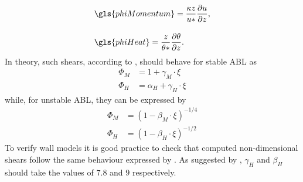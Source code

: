 \begin{align}
	& \gls{phiMomentum} = \frac{\kappa z}{u*} \frac{\partial u}{\partial z}, \\[10pt]
	& \gls{phiHeat} = \frac{z}{\theta*} \frac{\partial \theta}{\partial z}. 
\end{align}
In theory, such shears, according to \cite{Paulson1970}, should behave for stable ABL as
\begin{align}
	\Phi_M &= 1+\gamma_M\cdot\xi \label{eq:shearStableM}\\
	\Phi_H &= \alpha_H+\gamma_H\cdot\xi \label{eq:shearStableH} 
\end{align}
while, for unstable ABL, they can be expressed by
\begin{align}
	\Phi_M &= (1-\beta_M\cdot\xi)^{-1/4} \label{eq:shearUnstableM}\\
	\Phi_H &= (1-\beta_H\cdot\xi)^{-1/2} \label{eq:shearUnstableH} 
\end{align}
To verify wall models it is good practice to check that computed non-dimensional shears follow the same behaviour expressed by . As suggested by \cite{Paulson1970}, $\gamma_H$ and $\beta_H$ should take the values of $7.8$ and $9$ respectively.

